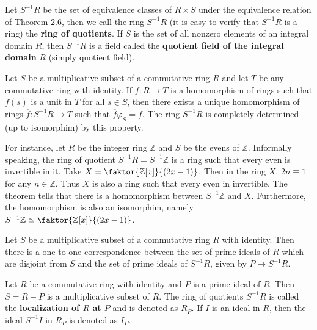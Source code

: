 \documentclass{article}
\begin{document}
Let $S^{-1}R$ be the set of equivalence classes of $R\times S$ under the equivalence relation of Theorem 2.6, then we call the ring $S^{-1}R$ (it is easy to verify that $S^{-1}R$ is a ring) the \textbf{ring of quotients}. If $S$ is the set of all nonzero elements of an integral domain $R$, then $S^{-1}R$ is a field called the \textbf{quotient field of the integral domain} $R$ (simply quotient field). 

\begin{theorem}
    Let $S$ be a multiplicative subset of a commutative ring $R$ and let $T$ be any commutative ring with identity. If $f:R \rightarrow T$ is a homomorphism of rings such that $f(s)$ is a unit in $T$ for all $s \in S$, then there exists a unique homomorphism of rings $\overline{f}:S^{-1}R \rightarrow T$ such that $\overline{f}\varphi_S = f$. The ring $S^{-1}R$ is completely determined (up to isomorphim) by this property.
\end{theorem}

\begin{example}
For instance, let $R$ be the integer ring $\mathbb{Z}$ and $S$ be the evens of $\mathbb{Z}$. Informally speaking, the ring of quotient $S^{-1}R=S^{-1}\mathbb{Z}$ is a ring such that every even is invertible in it. Take $X=\faktor{\mathbb{Z}[x]}{(2x-1)}$. Then in the ring $X$, $2n\equiv 1$ for any $n \in \mathbb{Z}$. Thus $X$ is also a ring such that every even in invertible. The theorem tells that there is a homomorphism between $S^{-1}\mathbb{Z}$ and $X$. Furthermore, the homomorphism is also an isomorphim, namely $S^{-1}\mathbb{Z} \simeq \faktor{\mathbb{Z}[x]}{(2x-1)}$.
\end{example}

\begin{theorem}
    Let $S$ be a multiplicative subset of a commutative ring $R$ with identity. Then there is a one-to-one correspondence between the set of prime ideals of $R$ which are disjoint from $S$ and the set of prime ideals of $S^{-1}R$, given by $P\mapsto S^{-1}R$.
\end{theorem}

\begin{definition}
    Let $R$ be a commutative ring with identity and $P$ is a prime ideal of $R$. Then $S=R-P$ is a multiplicative subset of $R$. The ring of quotients $S^{-1}R$ is called the \textbf{localization of $R$ at $P$} and is denoted as $R_P$. If $I$ is an ideal in $R$, then the ideal $S^{-1}I$ in $R_P$ is denoted as $I_P$.
\end{definition}
\end{document}
